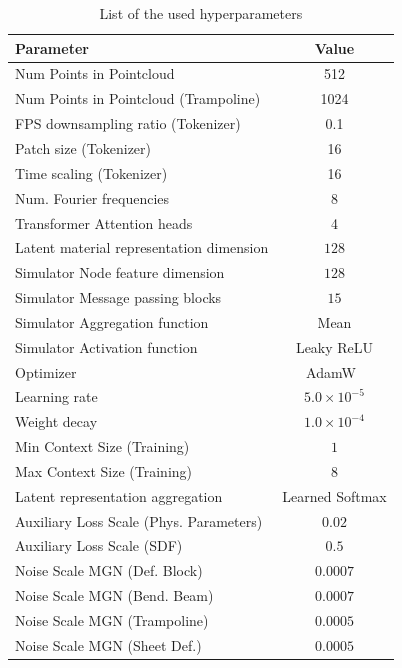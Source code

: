 \begin{table}[t]
\centering
\caption{List of the used hyperparameters}
\label{tab:appx_training_setup}
\begin{tabular}{lc}
\toprule
    Parameter & Value  \\ 
\midrule
Num Points in Pointcloud & 512 \\
Num Points in Pointcloud (Trampoline) & 1024 \\
FPS downsampling ratio (Tokenizer) & 0.1 \\
Patch size (Tokenizer) & 16 \\
Time scaling (Tokenizer) & 16 \\
Num. Fourier frequencies & 8 \\
Transformer Attention heads & 4 \\
Latent material representation dimension  & $128$ \\
Simulator Node feature dimension & $128$ \\
Simulator Message passing blocks & $15$ \\
Simulator Aggregation function & Mean \\
Simulator Activation function & Leaky ReLU \\
Optimizer & AdamW~\citep{adamw} \\
Learning rate & $5.0 \times 10^{-5}$ \\
Weight decay & $1.0 \times 10^{-4}$ \\
Min Context Size (Training) & $1$ \\
Max Context Size (Training) & $8$ \\
Latent representation aggregation & Learned Softmax \\
Auxiliary Loss Scale (Phys. Parameters) & $0.02$ \\
Auxiliary Loss Scale (SDF) & $0.5$ \\
Noise Scale MGN (Def. Block) & $0.0007$ \\
Noise Scale MGN (Bend. Beam) & $0.0007$ \\
Noise Scale MGN (Trampoline) & $0.0005$ \\
Noise Scale MGN (Sheet Def.) & $0.0005$ \\
\bottomrule
\end{tabular}
\end{table}

